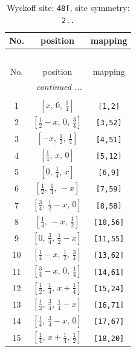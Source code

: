 \documentclass[fleqn,8pt]{jsarticle}
\begin{document}
\begin{longtable}{ccc}
\caption{Wyckoff site: {\tt 48f}, site symmetry: {\tt 2..}}
 \\
 \hline \hline
No. & position & mapping \\ \hline \endfirsthead

\multicolumn{2}{l}{\tablename\ \thetable{}} \\
 \hline \hline
No. & position & mapping \\ \hline \endhead

 \hline \hline
\multicolumn{2}{r}{\footnotesize\it continued ...} \\ \endfoot

 \hline \hline
\multicolumn{2}{r}{} \\ \endlastfoot

1 & $\left[ x,\, 0,\, \frac{1}{4} \right]$ & {\tt [1,2]} \\ \hline
2 & $\left[ \frac{1}{2} - x,\, 0,\, \frac{3}{4} \right]$ & {\tt [3,52]} \\ \hline
3 & $\left[ - x,\, \frac{1}{2},\, \frac{1}{4} \right]$ & {\tt [4,51]} \\ \hline
4 & $\left[ \frac{1}{4},\, x,\, 0 \right]$ & {\tt [5,12]} \\ \hline
5 & $\left[ 0,\, \frac{1}{4},\, x \right]$ & {\tt [6,9]} \\ \hline
6 & $\left[ \frac{1}{2},\, \frac{1}{4},\, - x \right]$ & {\tt [7,59]} \\ \hline
7 & $\left[ \frac{3}{4},\, \frac{1}{2} - x,\, 0 \right]$ & {\tt [8,58]} \\ \hline
8 & $\left[ \frac{1}{4},\, - x,\, \frac{1}{2} \right]$ & {\tt [10,56]} \\ \hline
9 & $\left[ 0,\, \frac{3}{4},\, \frac{1}{2} - x \right]$ & {\tt [11,55]} \\ \hline
10 & $\left[ \frac{1}{4} - x,\, \frac{1}{2},\, \frac{3}{4} \right]$ & {\tt [13,62]} \\ \hline
11 & $\left[ \frac{3}{4} - x,\, 0,\, \frac{1}{4} \right]$ & {\tt [14,61]} \\ \hline
12 & $\left[ \frac{1}{2},\, \frac{1}{4},\, x + \frac{1}{4} \right]$ & {\tt [15,24]} \\ \hline
13 & $\left[ \frac{1}{2},\, \frac{3}{4},\, \frac{1}{4} - x \right]$ & {\tt [16,71]} \\ \hline
14 & $\left[ \frac{1}{4},\, \frac{3}{4} - x,\, 0 \right]$ & {\tt [17,67]} \\ \hline
15 & $\left[ \frac{1}{4},\, x + \frac{1}{4},\, \frac{1}{2} \right]$ & {\tt [18,20]} \\ \hline

\end{longtable}
\end{document}
